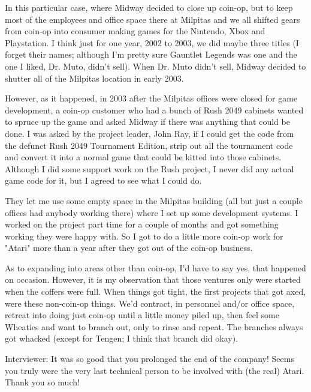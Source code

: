 In this particular case, where Midway decided to close up coin-op, but to keep most of the employees and office space there at Milpitas and we all shifted gears from coin-op into consumer making games for the Nintendo, Xbox and Playstation. I think just for one year, 2002 to 2003, we did maybe three titles (I forget their names; although I'm pretty sure Gauntlet Legends was one and the one I liked, Dr. Muto, didn't sell). When Dr. Muto didn't sell, Midway decided to shutter all of the Milpitas location in early 2003.

However, as it happened, in 2003 after the Milpitas offices were closed for game development, a coin-op customer who had a bunch of Rush 2049 cabinets wanted to spruce up the game and asked Midway if there was anything that could be done. I was asked by the project leader, John Ray, if I could get the code from the defunct Rush 2049 Tournament Edition, strip out all the tournament code and convert it into a normal game that could be kitted into those cabinets. Although I did some support work on the Rush project, I never did any actual game code for it, but I agreed to see what I could do. 

They let me use some empty space in the Milpitas building (all but just a couple offices had anybody working there) where I set up some development systems. I worked on the project part time for a couple of months and got something working they were happy with. So I got to do a little more coin-op work for "Atari" more than a year after they got out of the coin-op business.

As to expanding into areas other than coin-op, I'd have to say yes, that happened on occasion. However, it is my observation that those ventures only were started when the coffers were full. When things got tight, the first projects that got axed, were these non-coin-op things. We'd contract, in personnel and/or office space, retreat into doing just coin-op until a little money piled up, then feel some Wheaties and want to branch out, only to rinse and repeat. The branches always got whacked (except for Tengen; I think that branch did okay).

\textcolor{interviewer}{Interviewer:} It was so good that you prolonged the end of the company! Seems you truly were the very last technical person to be involved with (the real) Atari. Thank you so much!
